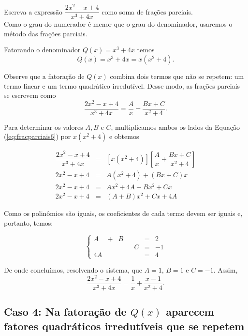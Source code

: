 \begin{exem}
    Escreva a expressão $\dfrac{2x^2 - x + 4}{x^3 + 4x}$ como soma de frações parciais. \\[10pt]

    Como o grau do numerador é menor que o grau do denominador, usaremos o método das frações parciais.

    Fatorando o denominador $Q(x) = x^3 + 4x$ temos $$Q(x) = x^3 + 4x = x(x^2 + 4).$$
    
    Observe que a fatoração de $Q(x)$ combina dois termos que não se repetem: um termo linear e um termo quadrático irredutível. Desse modo, as frações parciais se escrevem como 
    \begin{equation}
    \label{eq:fracparciais6}
    \dfrac{2x^2 - x + 4}{x^3 + 4x} = \dfrac{A}{x} + \dfrac{Bx + C}{x^2+4}.
    \end{equation}

    Para determinar os valores $A, B$ e $C$, multiplicamos ambos os lados da Equação (\ref{eq:fracparciais6}) por $x(x^2 + 4)$ e obtemos

     \begin{eqnarray*}
    [x(x^2 + 4)]\dfrac{2x^2 - x + 4}{x^3 + 4x} & = & [x(x^2 + 4)] \left[\dfrac{A}{x} + \dfrac{Bx + C}{x^2+4}\right]\\[5pt]
    2x^2 - x + 4 & =& A(x^2 + 4) + (Bx + C)x \\[5pt]
    2x^2 - x + 4 & =& Ax^2 + 4A + Bx^2  + Cx\\[5pt]
    2x^2 - x + 4 & = & (A+B)x^2 + Cx + 4A
    \end{eqnarray*}

    Como os polinômios são iguais, os coeficientes de cada termo devem ser iguais e, portanto, temos:

    \begin{equation*}
    \left\{ \begin{array}{ccccccc} 
    A & + & B &  &  &=& 2 \\[5pt]
     &  &  &  & C&=& -1\\[5pt]
    4A &  &  &  &  &=& 4
    \end{array}
    \right.    
    \end{equation*}

    De onde concluímos, resolvendo o sistema, que $A = 1, \, B = 1$ e $C = -1$. Assim, $$\dfrac{2x^2 - x + 4}{x^3 + 4x} = \dfrac{1}{x} + \dfrac{x -1}{x^2 + 4}.$$
 \end{exem}


\subsection{Caso 4: Na fatoração de $Q(x)$ aparecem fatores quadráticos irredutíveis que se repetem}

